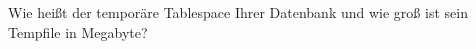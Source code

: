    \item Wie hei\ss{}t der tempor\"are Tablespace Ihrer Datenbank und wie gro\ss{} ist sein Tempfile in Megabyte?
